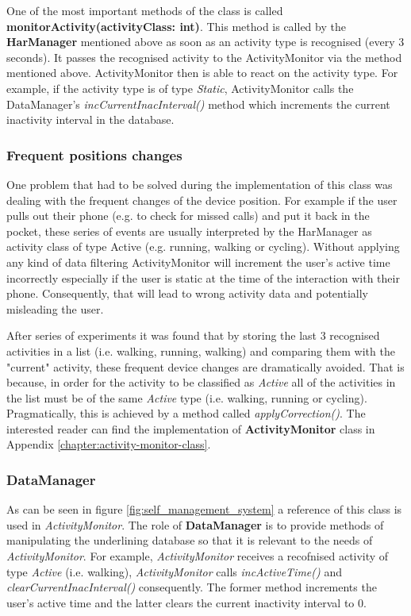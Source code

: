     One of the most important methods of the class is called \textbf{monitorActivity(activityClass: int)}. This method is called by the \textbf{HarManager} mentioned above as soon as an activity type is recognised (every 3 seconds). It passes the recognised activity to the ActivityMonitor via the method mentioned above. ActivityMonitor then is able to react on the activity type. For example, if the activity type is of type \textit{Static}, ActivityMonitor calls the DataManager's \textit{incCurrentInacInterval()} method which increments the current inactivity interval in the database.
    
    \subsubsection{Frequent positions changes}
    One problem that had to be solved during the implementation of this class was dealing with the frequent changes of the device position. For example if the user pulls out their phone (e.g. to check for missed calls) and put it back in the pocket, these series of events are usually interpreted by the HarManager as activity class of type Active (e.g. running, walking or cycling). Without applying any kind of data filtering ActivityMonitor will increment the user's active time incorrectly especially if the user is static at the time of the interaction with their phone. Consequently, that will lead to wrong activity data and potentially misleading the user.
    
    After series of experiments it was found that by storing the last 3 recognised activities in a list (i.e. walking, running, walking) and comparing them with the "current" activity, these frequent device changes are dramatically avoided. That is because, in order for the activity to be classified as \textit{Active} all of the activities in the list must be of the same \textit{Active} type (i.e. walking, running or cycling). Pragmatically, this is achieved by a method called \textit{applyCorrection()}. The interested reader can find the implementation of \textbf{ActivityMonitor} class in Appendix \ref{chapter:activity-monitor-class}.
    
    \subsubsection{DataManager}
    As can be seen in figure \ref{fig:self_management_system} a reference of this class is used in \textit{ActivityMonitor}. The role of \textbf{DataManager} is to provide methods of manipulating the underlining database so that it is relevant to the needs of \textit{ActivityMonitor}. For example, \textit{ActivityMonitor} receives a recofnised activity of type \textit{Active} (i.e. walking), \textit{ActivityMonitor} calls \textit{incActiveTime()} and \textit{clearCurrentInacInterval()} consequently. The former method increments the user's active time and the latter clears the current inactivity interval to 0.
    
